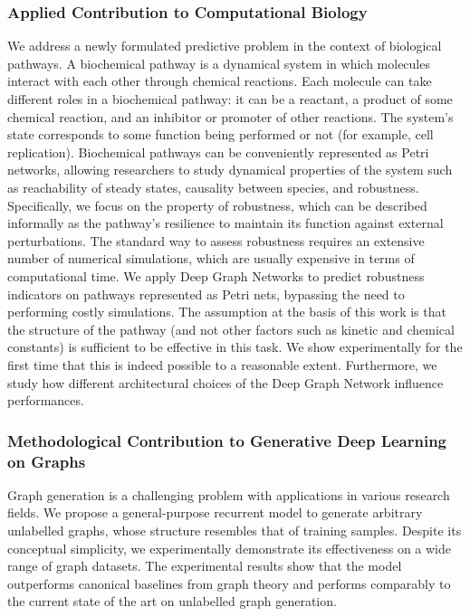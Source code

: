 \subsubsection*{Applied Contribution to Computational Biology}
We address a newly formulated predictive problem in the context of biological pathways. A biochemical pathway is a dynamical system in which molecules interact with each other through chemical reactions. Each molecule can take different roles in a biochemical pathway: it can be a reactant, a product of some chemical reaction, and an inhibitor or promoter of other reactions. The system's state corresponds to some function being performed or not (for example, cell replication). Biochemical pathways can be conveniently represented as Petri networks, allowing researchers to study dynamical properties of the system such as reachability of steady states, causality between species, and robustness. Specifically, we focus on the property of robustness, which can be described informally as the pathway's resilience to maintain its function against external perturbations. The standard way to assess robustness requires an extensive number of numerical simulations, which are usually expensive in terms of computational time. We apply Deep Graph Networks to predict robustness indicators on pathways represented as Petri nets, bypassing the need to performing costly simulations. The assumption at the basis of this work is that the structure of the pathway (and not other factors such as kinetic and chemical constants) is sufficient to be effective in this task. We show experimentally for the first time that this is indeed possible to a reasonable extent. Furthermore, we study how different architectural choices of the Deep Graph Network influence performances.



\subsubsection*{Methodological Contribution to Generative Deep Learning on Graphs}
Graph generation is a challenging problem with applications in various research fields. We propose a general-purpose recurrent model to generate arbitrary unlabelled graphs, whose structure resembles that of training samples. Despite its conceptual simplicity, we experimentally demonstrate its effectiveness on a wide range of graph datasets. The experimental results show that the model outperforms canonical baselines from graph theory and performs comparably to the current state of the art on unlabelled graph generation.

